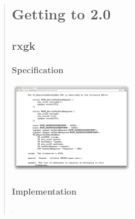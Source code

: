 \documentclass{beamer}
\begin{document}
\begin{frame}[fragile]
\begin{quote}
\begin{frame}
\section{Getting to 2.0}

\subsection{rxgk}

\begin{frame}
\frametitle{Specification}
\includegraphics[width=2.5in]{rxgk-afs-snapshot}
\end{frame}

\begin{frame}
\frametitle{Implementation}
\includegraphics[width=2.5]{gerrit-rxgk.png}
\end{frame}


\end{frame}
\end{quote}
\end{frame}
\end{document}
